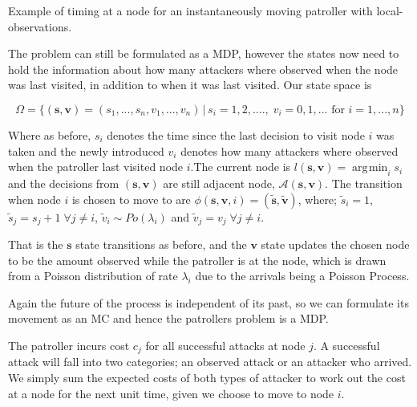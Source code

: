 \documentclass[a4paper,10pt]{article}
\DeclareMathOperator*{\argmin}{\arg\!\min}
\theoremstyle{definition}
\theoremstyle{definition}
\theoremstyle{remark}
\theoremstyle{definition}
\begin{document}
\begin{myfigure}
\begin{center}
\end{center}
\caption{Example of timing at a node for an instantaneously moving patroller with local-observations.}
\label{Figure:Example of timing for instantaneous and local observations}
\end{myfigure}

The problem can still be formulated as a MDP, however the states now need to hold the information about how many attackers where observed when the node was last visited, in addition to when it was last visited. Our state space is

$$\Omega= \{ (\bm{s},\bm{v})=(s_{1},...,s_{n},v_{1},...,v_{n}) \, | \, s_{i}=1,2,...., \; v_{i}=0,1,...  \text{ for } i=1,...,n\}$$

Where as before, $s_{i}$ denotes the time since the last decision to visit node $i$ was taken and the newly introduced $v_{i}$ denotes how many attackers where observed when the patroller last visited node $i$.The current node is $l(\bm{s},\bm{v})=\argmin_{i} s_{i}$ and the decisions from $(\bm{s},\bm{v})$ are still adjacent node, $\mathcal{A}(\bm{s},\bm{v})$. The transition when node $i$ is chosen to move to are $\phi(\bm{s},\bm{v},i)=(\widetilde{\bm{s}},\widetilde{\bm{v}})$, where; $\widetilde{s}_{i}=1$,  $\widetilde{s}_{j}=s_{j}+1 \; \forall j \neq i$, $\widetilde{v}_{i} \sim Po(\lambda_{i})$ and $\widetilde{v}_{j}=v_{j} \; \forall j \neq i$.

That is the $\bm{s}$ state transitions as before, and the $\bm{v}$ state updates the chosen node to be the amount observed while the patroller is at the node, which is drawn from a Poisson distribution of rate $\lambda_{i}$ due to the arrivals being a Poisson Process.

Again the future of the process is independent of its past, so we can formulate its movement as an MC and hence the patrollers problem is a MDP.

The patroller incurs cost $c_{j}$ for all successful attacks at node $j$. A successful attack will fall into two categories; an observed attack or an attacker who arrived. We simply sum the expected costs of both types of attacker to work out the cost at a node for the next unit time, given we choose to move to node $i$.
\end{document}
